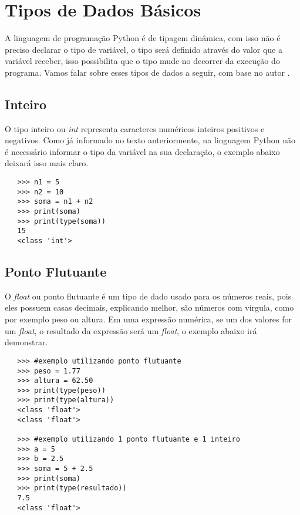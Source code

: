     \section{Tipos de Dados Básicos}
	A linguagem de programação Python é de tipagem dinâmica, com isso não é preciso declarar o tipo de variável, o tipo será definido através do valor que a variável receber, isso possibilita que o tipo mude no decorrer da execução do programa. Vamos falar sobre esses tipos de dados a seguir, com base no autor \cite{Severance2016}.
	
			\subsection{Inteiro}
			O tipo inteiro ou \textit{int} representa caracteres numéricos inteiros positivos e negativos. Como já informado no texto anteriormente, na linguagem Python não é necessário informar o tipo da variável na sua declaração, o exemplo abaixo deixará isso mais claro.
			\begin{lstlisting}
   >>> n1 = 5
   >>> n2 = 10
   >>> soma = n1 + n2
   >>> print(soma)	
   >>> print(type(soma))		
   15
   <class 'int'>
			\end{lstlisting}
		
			\subsection{Ponto Flutuante}
			O \textit{float} ou ponto flutuante é um tipo de dado usado para os números reais, pois eles possuem casas decimais, explicando melhor, são números com vírgula, como por exemplo peso ou altura. Em uma expressão numérica, se um dos valores for um \textit{float}, o resultado da expressão será um \textit{float}, o exemplo abaixo irá demonstrar.
			\begin{lstlisting}
   >>> #exemplo utilizando ponto flutuante
   >>> peso = 1.77
   >>> altura = 62.50
   >>> print(type(peso))
   >>> print(type(altura))
   <class 'float'>
   <class 'float'>
   
   >>> #exemplo utilizando 1 ponto flutuante e 1 inteiro
   >>> a = 5
   >>> b = 2.5
   >>> soma = 5 + 2.5
   >>> print(soma)
   >>> print(type(resultado))
   7.5
   <class 'float'>
			\end{lstlisting}
		
